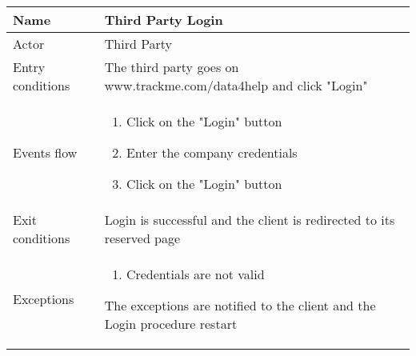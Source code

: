 \newpage
\begin{table}[h!]
\begin{tabular}{|l|p{12cm}|}
\hline
Name             & Third Party Login \\ \hline
Actor            & Third Party \\ \hline
Entry conditions & The third party goes on www.trackme.com/data4help and click "Login" \\ \hline
Events flow      & \begin{enumerate}
\item Click on the "Login" button
\item Enter the company credentials
\item Click on the "Login" button
\end{enumerate} \\ \hline
Exit conditions  & Login is successful and the client is redirected to its reserved page  \\ \hline
Exceptions       & \begin{enumerate}
\item Credentials are not valid
\end{enumerate} The exceptions are notified to the client and the Login procedure restart  \\ \hline
\end{tabular}
\end{table}

